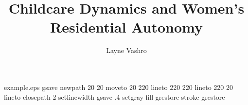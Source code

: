 %
%
%
%
%
\begin{filecontents*}{example.eps}
gsave
newpath
  20 20 moveto
  20 220 lineto
  220 220 lineto
  220 20 lineto
closepath
2 setlinewidth
gsave
  .4 setgray fill
grestore
stroke
grestore
\end{filecontents*}
%
\RequirePackage{fix-cm}
%
\documentclass[smallextended]{svjour3}       %
%
\smartqed  %
%
\usepackage{graphicx}
\usepackage{natbib}

%
%
%
%
%


\title{Childcare Dynamics and Women's Residential Autonomy%
}

\author{Layne Vashro
}



